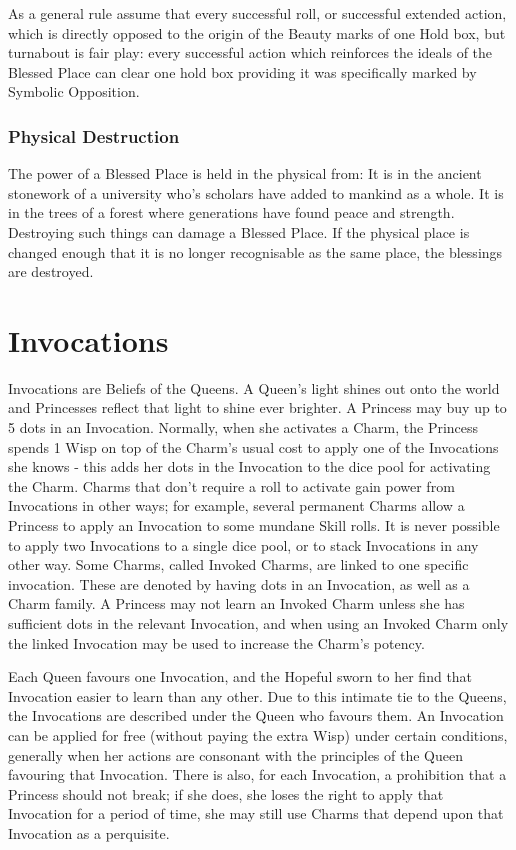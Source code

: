 As a general rule assume that every successful roll, or successful extended action, which is directly opposed to the origin of the Beauty marks of one Hold box, but turnabout is fair play: every successful action which reinforces the ideals of the Blessed Place can clear one hold box providing it was specifically marked by Symbolic Opposition. 
\subsubsection*{Physical Destruction}
The power of a Blessed Place is held in the physical from: It is in the ancient stonework of a university who's scholars have added to mankind as a whole. It is in the trees of a forest where generations have found peace and strength. Destroying such things can damage a Blessed Place. If the physical place is changed enough that it is no longer recognisable as the same place, the blessings are destroyed. 

\section*{Invocations}

Invocations are Beliefs of the Queens. A Queen's light shines out onto the world and Princesses reflect that light to shine ever brighter. A Princess may buy up to 5 dots in an Invocation. Normally, when she activates a Charm, the Princess spends 1 Wisp on top of the Charm's usual cost to apply one of the Invocations she knows - this adds her dots in the Invocation to the dice pool for activating the Charm. Charms that don't require a roll to activate gain power from Invocations in other ways; for example, several permanent Charms allow a Princess to apply an Invocation to some mundane Skill rolls. It is never possible to apply two Invocations to a single dice pool, or to stack Invocations in any other way. Some Charms, called Invoked Charms, are linked to one specific invocation. These are denoted by having dots in an Invocation, as well as a Charm family. A Princess may not learn an Invoked Charm unless she has sufficient dots in the relevant Invocation, and when using an Invoked Charm only the linked 
Invocation may be used to increase the Charm's potency. 

Each Queen favours one Invocation, and the Hopeful sworn to her find that Invocation easier to learn than any other. Due to this intimate tie to the Queens, the Invocations are described under the Queen who favours them. An Invocation can be applied for free (without paying the extra Wisp) under certain conditions, generally when her actions are consonant with the principles of the Queen favouring that Invocation. There is also, for each Invocation, a prohibition that a Princess should not break; if she does, she loses the right to apply that Invocation for a period of time, she may still use Charms that depend upon that Invocation as a perquisite.

